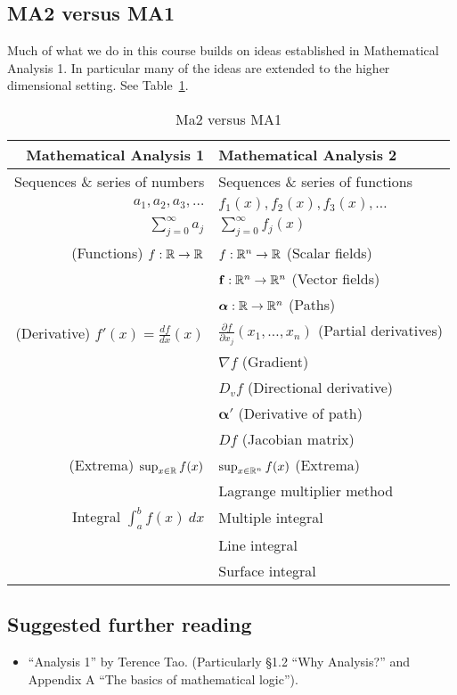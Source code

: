 \subsection*{MA2 versus MA1}

Much of what we do in this course builds on ideas established in Mathematical Analysis 1.
In particular many of the ideas are extended to the higher dimensional setting. See Table~\ref{tab:2versus1}.

\begin{table}
  \centering
  \begin{tabular}{r | l} %
      \textbf{Mathematical Analysis 1}
       &
      \textbf{Mathematical Analysis 2}  \\
      \midrule
      Sequences \& series of numbers
       &
      Sequences \& series  of functions \\
      \(a_1, a_2, a_3,\ldots \)
       &
      \(f_1(x), f_2(x), f_3(x),\ldots \)
      \\
      \(\sum_{j=0}^{\infty} a_j\)
       &
      \(\sum_{j=0}^{\infty} f_j(x)\)
      \\
      \midrule
      (Functions) \(f:\mathbb{R} \to \mathbb{R}\)
       &
      \(f:\mathbb{R}^n \to \mathbb{R}\) (Scalar fields)
      \\
       &
      \(\mathbf{f}:\mathbb{R}^n \to \mathbb{R}^n\) (Vector fields)
      \\
       &
      \(\boldsymbol{\alpha}:\mathbb{R} \to \mathbb{R}^n\) (Paths)
      \\
      \midrule
      (Derivative) \( f'(x) = \frac{df}{dx}(x)\)
       &
      \( \frac{\partial f}{\partial x_j}(x_1,\ldots,x_n)\) (Partial derivatives)
      \\
       &
      \(\nabla f\) (Gradient)
      \\
       &
      \(D_v f\) (Directional derivative)
      \\
       &
      \(\boldsymbol{\alpha}'\) (Derivative of path)
      \\
       &
      \(Df\) (Jacobian matrix)
      \\
      \midrule
      (Extrema) \(\sup_{x\in \mathbb{R}} f(x)\)
       &
      \(\sup_{x\in \mathbb{R}^n} f(x)\) (Extrema)
      \\
       &
      Lagrange multiplier method
      \\
      \midrule
      Integral \(\int_{a}^{b} f(x) \ dx\)
       &
      Multiple integral
      \\
       &
      Line integral
      \\
       &
      Surface integral
    \end{tabular}
    \caption{Ma2 versus MA1}%
    \label{tab:2versus1}  
\end{table}


\subsection*{Suggested further reading}

\begin{itemize}
  \item ``Analysis 1'' by Terence Tao.
        (Particularly \S 1.2 ``Why Analysis?'' and Appendix A ``The basics of mathematical logic'').
\end{itemize}